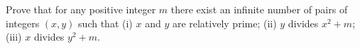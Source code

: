 Prove that for any positive integer $m$ there exist an infinite number of pairs of integers $(x, y)$ such that (i) $x$ and $y$ are relatively prime; (ii) $y$ divides $x^2 + m$; (iii) $x$ divides $y^2 + m$.
